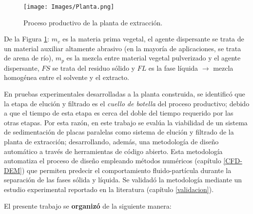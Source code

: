 \begin{figure}[h!]
	\centering
	\texttt{[image: Images/Planta.png]}
	\caption{Proceso productivo de la planta de extracci\'on.}
	\label{planta}
\end{figure}

\noindent
\justify

De la Figura \ref{planta}: $m_v$ es la materia prima vegetal, el agente dispersante se trata de un material auxiliar altamente abrasivo (en la mayor\'ia de aplicaciones, se trata de arena de r\'io), $m_p$ es la mezcla entre material vegetal pulverizado y el agente dispersante, $FS$ se trata del residuo s\'olido y $FL$ es la fase l\'iquida $\rightarrow$ mezcla homog\'enea entre el solvente y el extracto.

\noindent
\justify

En pruebas experimentales desarrolladas a la planta construida, se identific\'o que la etapa de eluci\'on y filtrado es el \textit{cuello de botella} del proceso productivo; debido a que el tiempo de esta etapa es cerca del doble del tiempo requerido por las otras etapas. Por esta raz\'on, en este trabajo se eval\'ua la viabilidad de un sistema de sedimentaci\'on de placas paralelas como sistema de eluci\'on y filtrado de la planta de extracci\'on; desarrollando, adem\'as, una metodolog\'ia de dise\~no autom\'atico a trav\'es de herramientas de c\'odigo abierto. Esta metodolog\'ia automatiza el proceso de dise\~no empleando m\'etodos num\'ericos (cap\'itulo \ref{CFD-DEM}) que permiten predecir el comportamiento fluido-part\'icula durante la separaci\'on de las fases s\'olida y l\'iquida. Se validad\'o la metodolog\'ia mediante un estudio experimental reportado en la literatura (cap\'itulo \ref{validacion}). 

\noindent
\justify

El presente trabajo se \textbf{organiz\'o} de la siguiente manera:

